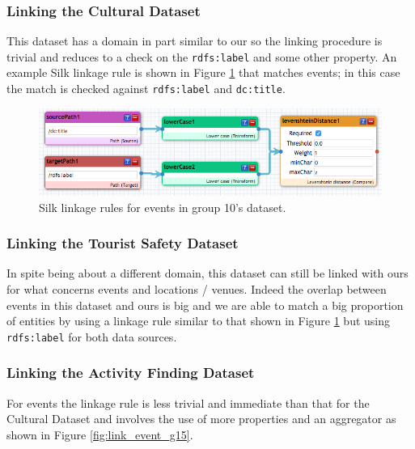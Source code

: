 \documentclass[runningheads,a4paper]{../../StyleFiles/llncs}
\begin{document}
\subsubsection{Linking the Cultural Dataset}
This dataset has a domain in part similar to our so the linking procedure
is trivial and reduces to a check on the \texttt{rdfs:label} and some other
property. An example Silk linkage rule is shown in Figure \ref{fig:link_event_g10}
that matches events; in this case the match is checked against
\texttt{rdfs:label} and \texttt{dc:title}.

\begin{figure}[h]
	\centering
	\includegraphics[width=1\textwidth]{img/link_event_g10.png}
	\caption{Silk linkage rules for events in group 10's dataset.}
	\label{fig:link_event_g10}
\end{figure}

\subsubsection{Linking the Tourist Safety Dataset}
In spite being about a different domain, this dataset can still be linked with
ours for what concerns events and locations / venues. Indeed the overlap between
events in this dataset and ours is big and we are able to match a big proportion
of entities by using a linkage rule similar to that shown in Figure
\ref{fig:link_event_g10} but using \texttt{rdfs:label} for both data sources.

\subsubsection{Linking the Activity Finding Dataset}
For events the linkage rule is less trivial and immediate than that for the
Cultural Dataset and involves the use of more properties and an aggregator as
shown in Figure \ref{fig:link_event_g15}.
\end{document}
